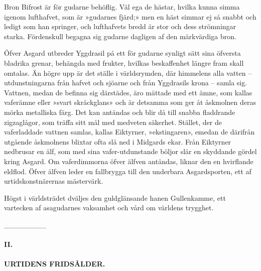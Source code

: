 Bron Bifrost är för gudarne behöflig. Väl ega de hästar, hvilka kunna
simma igenom lufthafvet, som är »gudarnes fjärd;» men en häst simmar ej
så snabbt och ledigt som han springer, och lufthafvets bredd är stor och
dess strömningar starka. Fördenskull begagna sig gudarne dagligen af den
märkvärdiga bron.

Öfver Asgard utbreder Yggdrasil på ett för gudarne synligt sätt sina
öfversta bladrika grenar, behängda med frukter, hvilkas beskaffenhet
längre fram skall omtalas. Än högre upp är det ställe i världsrymden,
där himmelens alla vatten -- utdunstningarna från hafvet och sjöarne och
från
Yggdrasils\protect\hypertarget{lb1625905.xhtmlux5cux23start15}{}{}\protect\hypertarget{lb1625905.xhtmlux5cux23start15-a}{}{}\protect\hypertarget{lb1625905.xhtmlux5cux23start15-b}{}{}\protect\hypertarget{lb1625905.xhtmlux5cux23start15-c}{}{}\protect\hypertarget{lb1625905.xhtmlux5cux23start15-d}{}{}
krona -- samla sig. Vattnen, medan de befinna sig därstädes, äro mättade
med ett ämne, som kallas vaferämne eller »svart skräckglans» och är
detsamma som ger åt åskmolnen deras mörka metalliska färg. Det kan
antändas och blir då till snabba fladdrande zigzaglågor, som träffa sitt
mål med medveten säkerhet. Stället, der de vaferladdade vattnen samlas,
kallas Eiktyrner, »ekstingaren», emedan de därifrån utgående åskmolnens
blixtar ofta slå ned i Midgards ekar. Från Eiktyrner nedbrusar en älf,
som med sina vafer-utdunstande böljor slår en skyddande gördel kring
Asgard. Om vaferdimmorna öfver älfven antändas, liknar den en hvirflande
eldflod. Öfver älfven leder en fallbrygga till den underbara
Asgardsporten, ett af urtidskonstnärernas mästervärk.

Högst i världsträdet dväljes den guldglänsande hanen Gullenkamme, ett
vartecken af asagudarnes vaksamhet och vård om världens trygghet.

{\_\_\_\_\_\_\_\_}

\protect\hypertarget{lb1625905.xhtmlux5cux23start16}{}{}\protect\hypertarget{lb1625905.xhtmlux5cux23start16-a}{}{}\protect\hypertarget{lb1625905.xhtmlux5cux23start16-b}{}{}\protect\hypertarget{lb1625905.xhtmlux5cux23start16-c}{}{}\protect\hypertarget{lb1625905.xhtmlux5cux23start16-d}{}{}

\paragraph{II.}

\paragraph{URTIDENS FRIDSÅLDER.}

